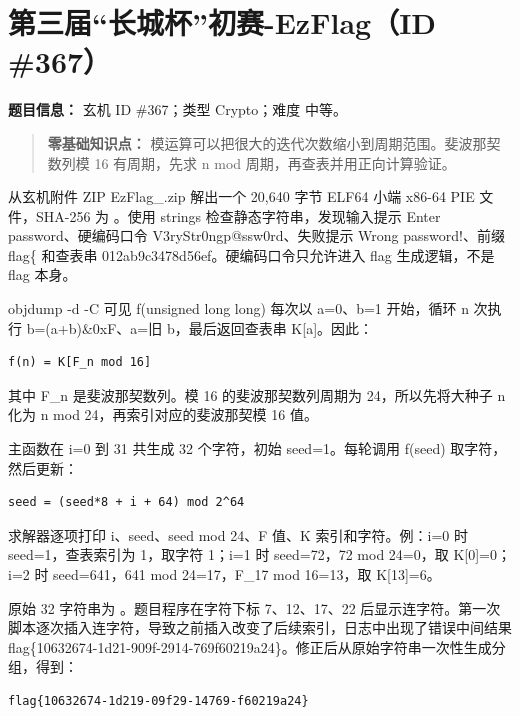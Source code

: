 \section{第三届``长城杯''初赛-EzFlag（ID \#367）}\label{ux7b2cux4e09ux5c4aux957fux57ceux676fux521dux8d5b-ezflagid-367}

\textbf{题目信息：} 玄机 ID \#367；类型 Crypto；难度 中等。

\begin{quote}
\textbf{零基础知识点：} 模运算可以把很大的迭代次数缩小到周期范围。斐波那契数列模 16 有周期，先求 n mod 周期，再查表并用正向计算验证。
\end{quote}

从玄机附件 ZIP EzFlag\_.zip 解出一个 20,640 字节 ELF64 小端 x86-64 PIE 文件，SHA-256 为 。使用 strings 检查静态字符串，发现输入提示 Enter password、硬编码口令 V3ryStr0ngp@ssw0rd、失败提示 Wrong password!、前缀 flag\{ 和查表串 012ab9c3478d56ef。硬编码口令只允许进入 flag 生成逻辑，不是 flag 本身。

objdump -d -C 可见 f(unsigned long long) 每次以 a=0、b=1 开始，循环 n 次执行 b=(a+b)\&0xF、a=旧 b，最后返回查表串 K{[}a{]}。因此：

\begin{verbatim}
f(n) = K[F_n mod 16]
\end{verbatim}

其中 F\_n 是斐波那契数列。模 16 的斐波那契数列周期为 24，所以先将大种子 n 化为 n mod 24，再索引对应的斐波那契模 16 值。

主函数在 i=0 到 31 共生成 32 个字符，初始 seed=1。每轮调用 f(seed) 取字符，然后更新：

\begin{verbatim}
seed = (seed*8 + i + 64) mod 2^64
\end{verbatim}

求解器逐项打印 i、seed、seed mod 24、F 值、K 索引和字符。例：i=0 时 seed=1，查表索引为 1，取字符 1；i=1 时 seed=72，72 mod 24=0，取 K{[}0{]}=0；i=2 时 seed=641，641 mod 24=17，F\_17 mod 16=13，取 K{[}13{]}=6。

原始 32 字符串为 。题目程序在字符下标 7、12、17、22 后显示连字符。第一次脚本逐次插入连字符，导致之前插入改变了后续索引，日志中出现了错误中间结果 flag\{10632674-1d21-909f-2914-769f60219a24\}。修正后从原始字符串一次性生成分组，得到：

\begin{verbatim}
flag{10632674-1d219-09f29-14769-f60219a24}
\end{verbatim}

